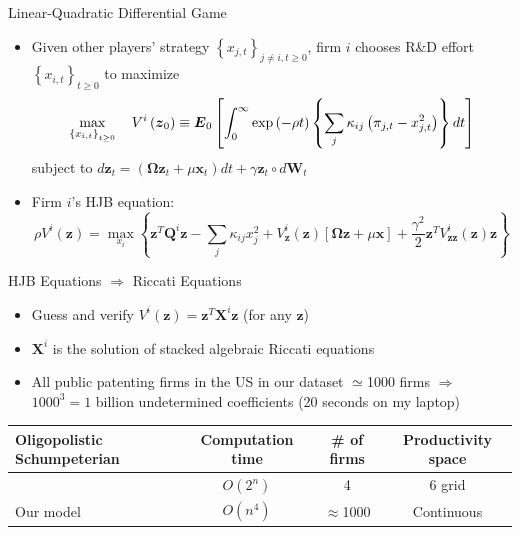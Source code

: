 \documentclass[
  10pt, %
  aspectratio=169,  %
  handout
]{beamer}
\theoremstyle{plain}
\begin{document}
\begin{frame}{Linear-Quadratic Differential Game}

  \begin{itemize}
    \item Given other players' strategy $\left\{ x_{j,t}\right\} _{j\neq i,t\geq0}$,
          firm $i$ chooses R\&D effort $\left\{ x_{i,t}\right\} _{t\geq0}$
          to maximize
          \[
            \max_{\left\{ x_{i,t}\right\} _{t\geq0}}\quad V^{i}\left(\text{\ensuremath{\boldsymbol{z}}}_{0}\right)\equiv\boldsymbol{E}_{0}\left[\int_{0}^{\infty}\exp\left(-\rho t\right)\left\{ \sum_{j}\kappa_{ij}\left(\pi_{j,t}-x_{j,t}^{2}\right)\right\} dt\right]
          \]
          subject to $d\boldsymbol{z}_{t}=\left(\boldsymbol{\Omega}\boldsymbol{z}_{t}+\mu\boldsymbol{x}_{t}\right)dt+\gamma\boldsymbol{z}_{t} \circ d\boldsymbol{W}_{t}$\pause\medskip{}
    \item Firm $i$'s HJB equation:
          \[
            \rho V^{i}\left(\boldsymbol{z}\right)=\max_{x_{i}}\left\{ \boldsymbol{z}^{T}\boldsymbol{Q}^{i}\boldsymbol{z}-\sum_{j}\kappa_{ij}x_{j}^{2}+V_{\boldsymbol{z}}^{i}\left(\boldsymbol{z}\right)\left[\boldsymbol{\Omega}\boldsymbol{z}+\mu\boldsymbol{x}\right]+\frac{\gamma^{2}}{2}\boldsymbol{z}^{T}V_{\boldsymbol{zz}}^{i}\left(\boldsymbol{z}\right)\boldsymbol{z}\right\}
          \]
  \end{itemize}
\end{frame}
%
\begin{frame}{HJB Equations $\Longrightarrow$ Riccati Equations}

  \label{hjb}
  \begin{itemize}
    \item Guess and verify $V^{i}\left(\boldsymbol{z}\right)=\boldsymbol{z}^{T}\boldsymbol{X}^{i}\boldsymbol{z}$
          (for any $\boldsymbol{z}$)
    \item $\boldsymbol{X}^{i}$ is the solution of stacked algebraic Riccati equations \hyperlink{riccati}{}
    \item All public patenting firms in the US in our dataset $\simeq$1000
          firms $\Longrightarrow$ \\
          $1000^{3}=1$ billion undetermined coefficients (20 seconds on my laptop)\medskip{}
  \end{itemize}
  \begin{center}
    \begin{tabular}{@{}p{5cm}ccc@{}}
      \toprule
      Oligopolistic Schumpeterian                                       & Computation time & \# of firms    & Productivity space \\
      \midrule
      \citet{Cavenaile2023-lo}                    & $O(2^n)$         & 4              & 6 grid       \\
      Our model                                   & $O(n^4)$         & $\approx$1000  & Continuous         \\
      \bottomrule
    \end{tabular}
  \end{center}

\end{frame}
\end{document}
